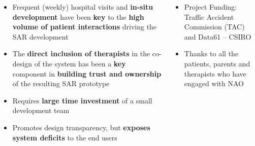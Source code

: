 \documentclass[a0paper, portrait]{tikzposter}
\begin{document}
\begin{columns}
 {
    \begin{itemize}
        \item Frequent (weekly) hospital visits and \textbf{in-situ development} have been 
        \textbf{key} to the \textbf{high volume of patient interactions} driving the SAR development
        \item The \textbf{direct inclusion of therapists} in the co-design of the system 
        has been a \textbf{key} component in \textbf{building trust and ownership} of the resulting SAR prototype
        \item Requires \textbf{large time investment} of a small development team 
        \item Promotes design transparency, but \textbf{exposes system deficits} to the end users
    \end{itemize}
 }
 {
    \begin{itemize}
        \item Project Funding: Traffic Accident Commission (TAC) and Data61 -- CSIRO
        \item Thanks to all the patients, parents and therapists who have engaged with NAO
    \end{itemize}
 }
\end{columns}
\end{document}
